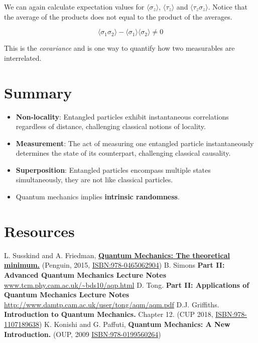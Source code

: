 \documentclass[]{tufte-handout}
\providecommand{\tightlist}{%
  \setlength{\itemsep}{0pt}\setlength{\parskip}{0pt}}
\begin{document}
We can again calculate expectation values for \(\langle\sigma_z\rangle\), \(\langle\tau_z\rangle\) and \(\langle\tau_z\sigma_z\rangle\). Notice that the average of the products does not equal to the product of the averages.

\[
\langle\sigma_1\sigma_2\rangle-\langle\sigma_1\rangle \langle\sigma_2\rangle \neq 0
\]

This is the \emph{covariance} and is one way to quantify how two measurables are interrelated.

\hypertarget{summary}{%
\section{Summary}\label{summary}}

\begin{itemize}
\tightlist
\item
  \textbf{Non-locality}: Entangled particles exhibit instantaneous correlations regardless of distance, challenging classical notions of locality.
\item
  \textbf{Measurement}: The act of measuring one entangled particle instantaneously determines the state of its counterpart, challenging classical causality.
\item
  \textbf{Superposition}: Entangled particles encompass multiple states simultaneously, they are not like classical particles.
\item
  Quantum mechanics implies \textbf{intrinsic randomness}.
\end{itemize}

\hypertarget{resources}{%
\section{Resources}\label{resources}}

L. Susskind and A. Friedman, \textbf{\href{https://www.penguin.co.uk/books/253263/quantum-mechanics-the-theoretical-minimum-by-friedman-leonard-susskind-and-art/9780141977812}{Quantum Mechanics: The theoretical minimum.}} (Penguin, 2015, \url{ISBN:978-0465062904})
B. Simons \textbf{Part II: Advanced Quantum Mechanics Lecture Notes} \url{www.tcm.phy.cam.ac.uk/~bds10/aqp.html}
D. Tong. \textbf{Part II: Applications of Quantum Mechanics Lecture Notes} \url{http://www.damtp.cam.ac.uk/user/tong/aqm/aqm.pdf}
D.J. Griffiths. \textbf{Introduction to Quantum Mechanics.} Chapter 12. (CUP 2018, \url{ISBN:978-1107189638})
K. Konishi and G. Paffuti, \textbf{Quantum Mechanics: A New Introduction.} (OUP, 2009 \url{ISBN:978-0199560264})
\end{document}
